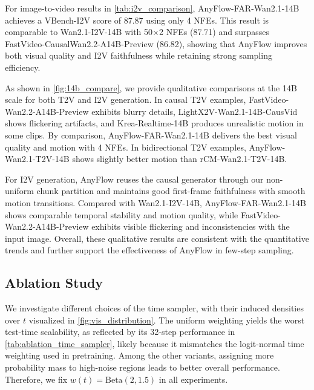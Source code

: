 For image-to-video results in \cref{tab:i2v_comparison}, AnyFlow-FAR-Wan2.1-14B achieves a VBench-I2V score of 87.87 using only 4 NFEs. This result is comparable to Wan2.1-I2V-14B with 50$\times$2 NFEs (87.71) and surpasses FastVideo-CausalWan2.2-A14B-Preview (86.82), showing that AnyFlow improves both visual quality and I2V faithfulness while retaining strong sampling efficiency.

As shown in \cref{fig:14b_compare}, we provide qualitative comparisons at the 14B scale for both T2V and I2V generation. In causal T2V examples, FastVideo-Wan2.2-A14B-Preview exhibits blurry details, LightX2V-Wan2.1-14B-CausVid shows flickering artifacts, and Krea-Realtime-14B produces unrealistic motion in some clips. By comparison, AnyFlow-FAR-Wan2.1-14B delivers the best visual quality and motion with 4 NFEs. In bidirectional T2V examples, AnyFlow-Wan2.1-T2V-14B shows slightly better motion than rCM-Wan2.1-T2V-14B.

For I2V generation, AnyFlow reuses the causal generator through our non-uniform chunk partition and maintains good first-frame faithfulness with smooth motion transitions. Compared with Wan2.1-I2V-14B, AnyFlow-FAR-Wan2.1-14B shows comparable temporal stability and motion quality, while FastVideo-Wan2.2-A14B-Preview exhibits visible flickering and inconsistencies with the input image. Overall, these qualitative results are consistent with the quantitative trends and further support the effectiveness of AnyFlow in few-step sampling.




\subsection{Ablation Study}
We investigate different choices of the time sampler, with their induced densities over $t$ visualized in \cref{fig:vis_distribution}. The uniform weighting yields the worst test-time scalability, as reflected by its 32-step performance in \cref{tab:ablation_time_sampler}, likely because it mismatches the logit-normal time weighting used in pretraining. Among the other variants, assigning more probability mass to high-noise regions leads to better overall performance. Therefore, we fix $w(t)=\text{Beta}(2, 1.5)$ in all experiments.

